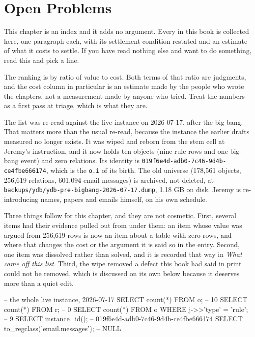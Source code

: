 \chapter{Open Problems}

This chapter is an index and it adds no argument. Every  in this book is collected here, one paragraph each, with its settlement condition restated and an estimate of what it costs to settle. If you have read nothing else and want to do something, read this and pick a line.

The ranking is by ratio of value to cost. Both terms of that ratio are judgments, and the cost column in particular is an estimate made by the people who wrote the chapters, not a measurement made by anyone who tried. Treat the numbers as a first pass at triage, which is what they are.

The list was re-read against the live instance on 2026-07-17, after the big bang. That matters more than the usual re-read, because the instance the earlier drafts measured no longer exists. It was wiped and reborn from the stem cell at Jeremy's instruction, and it now holds ten objects (nine rule rows and one big-bang event) and zero relations. Its identity is \texttt{019f6e4d-adb0-7c46-9d4b-ce4fbe666174}, which is the \texttt{o.i} of its birth. The old universe (178,561 objects, 256,619 relations, 601,094 email messages) is archived, not deleted, at \texttt{backups/ydb/ydb-pre-bigbang-2026-07-17.dump}, 1.18 GB on disk. Jeremy is re-introducing names, papers and emails himself, on his own schedule.

Three things follow for this chapter, and they are not cosmetic. First, several items had their evidence pulled out from under them: an item whose value was argued from 256,619 rows is now an item about a table with zero rows, and where that changes the cost or the argument it is said so in the entry. Second, one item was dissolved rather than solved, and it is recorded that way in \textit{What came off this list}. Third, the wipe removed a defect this book had said in print could not be removed, which is discussed on its own below because it deserves more than a quiet edit.

\begin{Check}
-- the whole live instance, 2026-07-17
SELECT count(*) FROM o;                                    -- 10
SELECT count(*) FROM r;                                    -- 0
SELECT count(*) FROM o WHERE j->>'type' = 'rule';          -- 9
SELECT instance_id();  -- 019f6e4d-adb0-7c46-9d4b-ce4fbe666174
SELECT to_regclass('email.messages');                      -- NULL
\end{Check}

